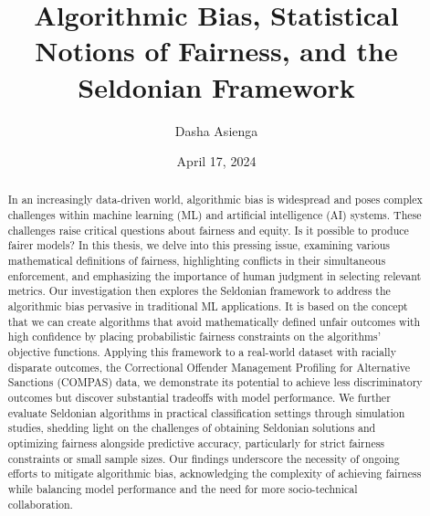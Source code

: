 \documentclass[12pt, twoside]{amherstthesis}
\title{Algorithmic Bias, Statistical Notions of Fairness, and the Seldonian Framework}
\author{Dasha Asienga}
\date{April 17, 2024}
\begin{document}
\doublespace
  \maketitle

\frontmatter %
\pagestyle{fancyplain}

  \begin{abstract}
    In an increasingly data-driven world, algorithmic bias is widespread and poses complex challenges within machine learning (ML) and artificial intelligence (AI) systems. These challenges raise critical questions about fairness and equity. Is it possible to produce fairer models? In this thesis, we delve into this pressing issue, examining various mathematical definitions of fairness, highlighting conflicts in their simultaneous enforcement, and emphasizing the importance of human judgment in selecting relevant metrics. Our investigation then explores the Seldonian framework to address the algorithmic bias pervasive in traditional ML applications. It is based on the concept that we can create algorithms that avoid mathematically defined unfair outcomes with high confidence by placing probabilistic fairness constraints on the algorithms' objective functions. Applying this framework to a real-world dataset with racially disparate outcomes, the Correctional Offender Management Profiling for Alternative Sanctions (COMPAS) data, we demonstrate its potential to achieve less discriminatory outcomes but discover substantial tradeoffs with model performance. We further evaluate Seldonian algorithms in practical classification settings through simulation studies, shedding light on the challenges of obtaining Seldonian solutions and optimizing fairness alongside predictive accuracy, particularly for strict fairness constraints or small sample sizes. Our findings underscore the necessity of ongoing efforts to mitigate algorithmic bias, acknowledging the complexity of achieving fairness while balancing model performance and the need for more socio-technical collaboration.
  \end{abstract}
\end{document}
